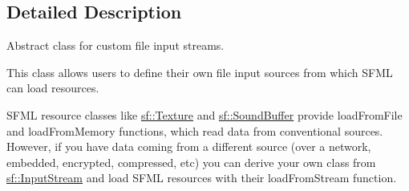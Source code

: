 \subsection{Detailed Description}
Abstract class for custom file input streams. 

This class allows users to define their own file input sources from which S\-F\-M\-L can load resources.

S\-F\-M\-L resource classes like \hyperlink{classsf_1_1_texture}{sf\-::\-Texture} and \hyperlink{classsf_1_1_sound_buffer}{sf\-::\-Sound\-Buffer} provide load\-From\-File and load\-From\-Memory functions, which read data from conventional sources. However, if you have data coming from a different source (over a network, embedded, encrypted, compressed, etc) you can derive your own class from \hyperlink{classsf_1_1_input_stream}{sf\-::\-Input\-Stream} and load S\-F\-M\-L resources with their load\-From\-Stream function.

